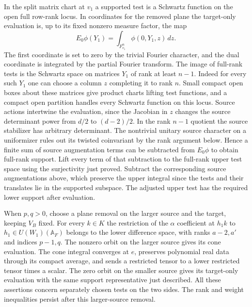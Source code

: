 In the split matrix chart at \(v_1\) a supported test is a Schwartz
function on the open full row-rank locus. In coordinates for the
removed plane the target-only evaluation is, up to its fixed nonzero
measure factor, the map
\[
 E_0\phi(Y_1)=\int_{F_{v_1}^n}\phi(0,Y_1,z)\,dz.
\]
The first coordinate is set to zero by the trivial Fourier character,
and the dual coordinate is integrated by the partial Fourier transform.
The image of full-rank tests is the Schwartz space on matrices \(Y_1\)
of rank at least \(n-1\). Indeed for every such \(Y_1\) one can choose
a column \(z\) completing it to rank \(n\). Small compact open boxes
about these matrices give product charts lifting test functions, and
a compact open partition handles every Schwartz function on this
locus. Source actions intertwine the evaluation, since the Jacobian
in \(z\) changes the source determinant power from \(d/2\) to
\((d-2)/2\). In the rank \(n-1\) quotient the source stabilizer has
arbitrary determinant. The nontrivial unitary source character on
a uniformizer rules out its twisted coinvariant by the rank argument
below. Hence a finite sum of source augmentation terms can be
subtracted from \(E_0\phi\) to obtain full-rank support. Lift every
term of that subtraction to the full-rank upper test space using
the surjectivity just proved. Subtract the corresponding source
augmentations above, which preserve the upper integral since the
tests and their translates lie in the supported subspace. The
adjusted upper test has the required lower support after evaluation.

When \(p,q>0\), choose a plane removal on the larger source and
the target, keeping \(V_B\) fixed. For every \(k\in K\) the
restriction of the \(\alpha\) coefficient at \(h_1k\) to
\(h_1\in U(W_1)(\mathbb A_F)\) belongs to the lower difference
space, with ranks \(a-2,a'\) and indices \(p-1,q\). The nonzero
orbit on the larger source gives its cone evaluation. The cone
integral converges at \(e\), preserves polynomial real data through
its compact average, and sends a restricted tensor to a lower
restricted tensor times a scalar. The zero orbit on the smaller
source gives its target-only evaluation with the same support
representative just described. All these assertions concern separately
chosen tests on the two sides. The rank and weight inequalities
persist after this larger-source removal.

